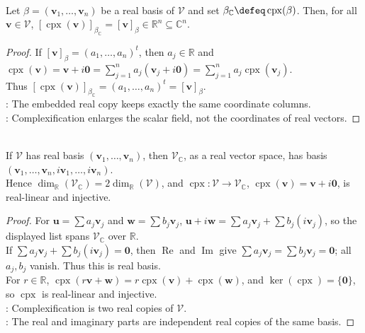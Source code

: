 \begin{corollary} \label{cor:complexification-coordinate-compatibility} \\
Let $\beta=(\mathbf{v}_1,\ldots,\mathbf{v}_n)$ be a real basis of $\mathcal{V}$ and set $\beta_{\mathbb{C}}\defeq\operatorname{cpx}(\beta)$. Then, for all $\mathbf{v}\in\mathcal{V}$, $[\operatorname{cpx}(\mathbf{v})]_{\beta_{\mathbb{C}}}=[\mathbf{v}]_{\beta}\in\mathbb{R}^n\subseteq\mathbb{C}^n$.
\begin{proof}
If $[\mathbf{v}]_{\beta}=(a_1,\ldots,a_n)^t$, then $a_j\in\mathbb{R}$ and $\operatorname{cpx}(\mathbf{v})=\mathbf{v}+i\mathbf{0} =\sum\limits_{j=1}^{n}a_j(\mathbf{v}_j+i\mathbf{0}) =\sum\limits_{j=1}^{n}a_j\operatorname{cpx}(\mathbf{v}_j)$.\\
Thus $[\operatorname{cpx}(\mathbf{v})]_{\beta_{\mathbb{C}}}=(a_1,\ldots,a_n)^t=[\mathbf{v}]_{\beta}$.\\
: The embedded real copy keeps exactly the same coordinate columns.\\
: Complexification enlarges the scalar field, not the coordinates of real vectors.
\end{proof}
\end{corollary}

\begin{proposition} \label{prop:complexification-real-dimension-and-embedding} \\
If $\mathcal{V}$ has real basis $(\mathbf{v}_1,\ldots,\mathbf{v}_n)$, then $\mathcal{V}_{\mathbb{C}}$, as a real vector space, has basis $(\mathbf{v}_1,\ldots,\mathbf{v}_n,i\mathbf{v}_1,\ldots,i\mathbf{v}_n)$.\\
Hence $\dim_{\mathbb{R}}(\mathcal{V}_{\mathbb{C}})=2\dim_{\mathbb{R}}(\mathcal{V})$, and $\operatorname{cpx}:\mathcal{V}\to\mathcal{V}_{\mathbb{C}}$, $\operatorname{cpx}(\mathbf{v})=\mathbf{v}+i\mathbf{0}$, is real-linear and injective.
\begin{proof}
For $\mathbf{u}=\sum a_j\mathbf{v}_j$ and $\mathbf{w}=\sum b_j\mathbf{v}_j$, $\mathbf{u}+i\mathbf{w}=\sum a_j\mathbf{v}_j+\sum b_j(i\mathbf{v}_j)$, so the displayed list spans $\mathcal{V}_{\mathbb{C}}$ over $\mathbb{R}$.\\
If $\sum a_j\mathbf{v}_j+\sum b_j(i\mathbf{v}_j)=\mathbf{0}$, then $\operatorname{Re}$ and $\operatorname{Im}$ give $\sum a_j\mathbf{v}_j=\sum b_j\mathbf{v}_j=\mathbf{0}$; all $a_j,b_j$ vanish. Thus this is real basis.\\
For $r\in\mathbb{R}$, $\operatorname{cpx}(r\mathbf{v}+\mathbf{w})=r\operatorname{cpx}(\mathbf{v})+\operatorname{cpx}(\mathbf{w})$, and $\ker(\operatorname{cpx})=\{\mathbf{0}\}$, so $\operatorname{cpx}$ is real-linear and injective.\\
: Complexification is two real copies of $\mathcal{V}$.\\
: The real and imaginary parts are independent real copies of the same basis.
\end{proof}
\end{proposition}

